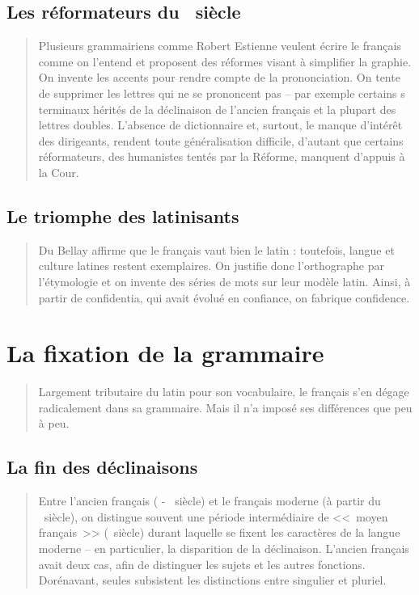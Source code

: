 \subsection{Les réformateurs du \textsc{}~siècle}\label{subsec:ref}
\begin{quotation}
  Plusieurs grammairiens comme Robert Estienne veulent écrire le
  français comme on l'entend et proposent des réformes visant à
  simplifier la graphie.
  On invente les accents pour rendre compte de la prononciation. On
  tente de supprimer les lettres qui ne se prononcent pas -- par
  exemple certains s terminaux hérités de la déclinaison de l'ancien
  français et la plupart des lettres doubles.
  L'absence de dictionnaire et, surtout, le manque d'intérêt des
  dirigeants, rendent toute généralisation difficile, d'autant que
  certains réformateurs, des humanistes tentés par la Réforme,
  manquent d'appuis à la Cour.
\end{quotation}

\subsection{Le triomphe des latinisants}\label{subsec:trilat}

\begin{quotation}
  Du Bellay affirme que le français vaut bien le latin : toutefois,
  langue et culture latines restent exemplaires. On justifie donc
  l'orthographe par l'étymologie et on invente des séries de mots sur
  leur modèle latin. Ainsi, à partir de confidentia, qui avait évolué
  en confiance, on fabrique confidence.
\end{quotation}

\section{La fixation de la grammaire}\label{sec:fixgram}

\begin{quote}
  Largement tributaire du latin pour son vocabulaire, le français s'en
  dégage radicalement dans sa grammaire. Mais il n'a imposé ses
  différences que peu à peu.
\end{quote}

\subsection{La fin des déclinaisons}\label{subsec:findec}

\begin{quotation}
  Entre l'ancien français (\textsc{} -
\textsc{}~siècle) et le français moderne (à
partir du \textsc{}~siècle), on distingue
souvent une période intermédiaire de <<~moyen français~>>
(\textsc{}~siècle) durant laquelle se fixent les
caractères de la langue moderne -- en particulier, la disparition de
la déclinaison. L'ancien français avait deux cas, afin de distinguer
les sujets et les autres fonctions.
Dorénavant, seules subsistent les distinctions entre singulier et pluriel.
\end{quotation}

